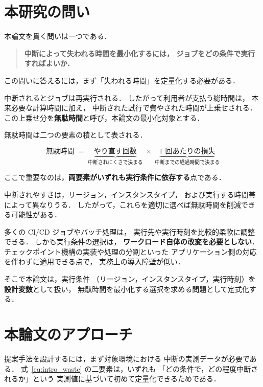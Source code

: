 \documentclass[11pt,a4paper]{ltjsreport}
\begin{document}
\section{本研究の問い}
\label{sec:question}

本論文を貫く問いは一つである．

\begin{quote}
\textbf{中断によって失われる時間を最小化するには，
ジョブをどの条件で実行すればよいか．}
\end{quote}

この問いに答えるには，まず「失われる時間」を定量化する必要がある．

中断されるとジョブは再実行される．
したがって利用者が支払う総時間は，
本来必要な計算時間に加え，
中断された試行で費やされた時間が上乗せされる．
この上乗せ分を\textbf{無駄時間}と呼び，本論文の最小化対象とする．

無駄時間は二つの要素の積として表される．

\begin{equation}
\text{無駄時間} \;=\;
\underbrace{\text{やり直す回数}}_{\text{中断されにくさで決まる}}
\;\times\;
\underbrace{\text{1 回あたりの損失}}_{\text{中断までの経過時間で決まる}}
\label{eq:intro_waste}
\end{equation}

ここで重要なのは，\textbf{両要素がいずれも実行条件に依存する}点である．

中断されやすさは，リージョン，インスタンスタイプ，
および実行する時間帯によって異なりうる．
したがって，これらを適切に選べば無駄時間を削減できる可能性がある．

多くの CI/CD ジョブやバッチ処理は，
実行先や実行時刻を比較的柔軟に調整できる．
しかも実行条件の選択は，
\textbf{ワークロード自体の改変を必要としない}．
チェックポイント機構の実装や処理の分割といった
アプリケーション側の対応を伴わずに適用できる点で，
実務上の導入障壁が低い．

そこで本論文は，実行条件
（リージョン，インスタンスタイプ，実行時刻）を\textbf{設計変数}として扱い，
無駄時間を最小化する選択を求める問題として定式化する．

\section{本論文のアプローチ}

提案手法を設計するには，まず対象環境における
中断の実測データが必要である．
式~\eqref{eq:intro_waste} の二要素は，いずれも
「どの条件で，どの程度中断されるか」という
実測値に基づいて初めて定量化できるためである．
\end{document}
